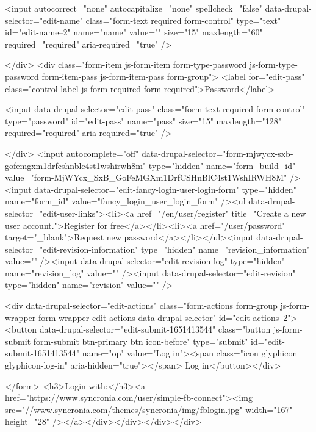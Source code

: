   
  <input autocorrect="none" autocapitalize="none" spellcheck="false" data-drupal-selector="edit-name" class="form-text required form-control" type="text" id="edit-name--2" name="name" value="" size="15" maxlength="60" required="required" aria-required="true" />

  
  
  </div>
<div class="form-item js-form-item form-type-password js-form-type-password form-item-pass js-form-item-pass form-group">
      <label for="edit-pass" class="control-label js-form-required form-required">Password</label>
  
  
  <input data-drupal-selector="edit-pass" class="form-text required form-control" type="password" id="edit-pass" name="pass" size="15" maxlength="128" required="required" aria-required="true" />

  
  
  </div>
<input autocomplete="off" data-drupal-selector="form-mjwycx-sxb-gofemgxm1drfcshnblc4st1wshirwh8m" type="hidden" name="form_build_id" value="form-MjWYcx_SxB_GoFeMGXm1DrfCSHnBlC4st1WshIRWH8M" /><input data-drupal-selector="edit-fancy-login-user-login-form" type="hidden" name="form_id" value="fancy_login_user_login_form" /><ul data-drupal-selector="edit-user-links"><li><a href="/en/user/register" title="Create a new user account.">Register for free</a></li><li><a href="/user/password" target="_blank">Request new password</a></li></ul><input data-drupal-selector="edit-revision-information" type="hidden" name="revision_information" value="" /><input data-drupal-selector="edit-revision-log" type="hidden" name="revision_log" value="" /><input data-drupal-selector="edit-revision" type="hidden" name="revision" value="" />

<div data-drupal-selector="edit-actions" class="form-actions form-group js-form-wrapper form-wrapper edit-actions data-drupal-selector" id="edit-actions--2"><button data-drupal-selector="edit-submit-1651413544" class="button js-form-submit form-submit btn-primary btn icon-before" type="submit" id="edit-submit-1651413544" name="op" value="Log in"><span class="icon glyphicon glyphicon-log-in" aria-hidden="true"></span>
Log in</button></div>

</form>
<h3>Login with:</h3><a href="https://www.syncronia.com/user/simple-fb-connect"><img src="//www.syncronia.com/themes/syncronia/img/fblogin.jpg" width="167" height="28" /></a></div></div></div></div>

